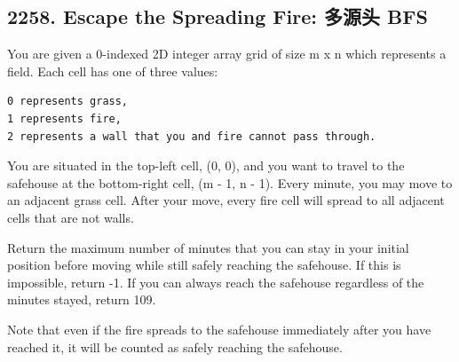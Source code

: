 \documentclass[9pt, b5paaper]{book}
\begin{document}
\subsection{2258. Escape the Spreading Fire: 多源头 BFS}
\label{sec-1-11-2}
You are given a 0-indexed 2D integer array grid of size m x n which represents a field. Each cell has one of three values:
\begin{verbatim}
0 represents grass,
1 represents fire,
2 represents a wall that you and fire cannot pass through.
\end{verbatim}
You are situated in the top-left cell, (0, 0), and you want to travel to the safehouse at the bottom-right cell, (m - 1, n - 1). Every minute, you may move to an adjacent grass cell. After your move, every fire cell will spread to all adjacent cells that are not walls.

Return the maximum number of minutes that you can stay in your initial position before moving while still safely reaching the safehouse. If this is impossible, return -1. If you can always reach the safehouse regardless of the minutes stayed, return 109.

Note that even if the fire spreads to the safehouse immediately after you have reached it, it will be counted as safely reaching the safehouse.
\end{document}
